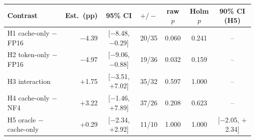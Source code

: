 \begin{tabular}{lrccccc}
\toprule
Contrast & Est.\ (pp) & 95\% CI & $+/-$ & raw $p$ & Holm $p$ & 90\% CI (H5) \\
\midrule
H1 cache-only $-$ FP16 & $-$4.39 & [$-$8.48, $-$0.29] & 20/35 & 0.060 & 0.241 & -- \\
H2 token-only $-$ FP16 & $-$4.97 & [$-$9.06, $-$0.88] & 19/36 & 0.032 & 0.159 & -- \\
H3 interaction & $+$1.75 & [$-$3.51, $+$7.02] & 35/32 & 0.597 & 1.000 & -- \\
H4 cache-only $-$ NF4 & $+$3.22 & [$-$1.46, $+$7.89] & 37/26 & 0.208 & 0.623 & -- \\
H5 oracle $-$ cache-only & $+$0.29 & [$-$2.34, $+$2.92] & 11/10 & 1.000 & 1.000 & [$-$2.05, $+$2.34] \\
\bottomrule
\end{tabular}
